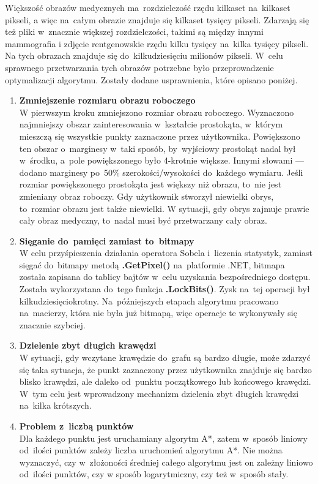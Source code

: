 \documentclass[a4paper,11pt,twoside,openright]{report}
\theoremstyle{definition}
\begin{document}
Większość obrazów medycznych ma~rozdzielczość rzędu kilkaset na~kilkaset pikseli,
a więc na~całym obrazie znajduje się kilkaset tysięcy pikseli. Zdarzają się też
pliki w~znacznie większej rozdzielczości, takimi są między innymi mammografia i
zdjęcie rentgenowskie rzędu kilku tysięcy na~kilka tysięcy pikseli.
Na tych obrazach znajduje się do~kilkudziesięciu milionów
pikseli. W~celu sprawnego przetwarzania tych obrazów potrzebne było przeprowadzenie optymalizacji
algorytmu. Zostały dodane usprawnienia, które opisano poniżej.
\begin{enumerate}
\item \textbf {Zmniejszenie rozmiaru obrazu roboczego} \\
W pierwszym kroku zmniejszono rozmiar obrazu roboczego. Wyznaczono najmniejszy obszar zainteresowania w~kształcie
prostokąta, w~którym mieszczą się wszystkie punkty zaznaczone przez użytkownika.
Powiększono ten obszar o~marginesy w~taki sposób, by~wyjściowy prostokąt nadal
był w~środku, a~pole powiększonego było 4-krotnie większe. Innymi słowami ---
dodano marginesy po~50\% szerokości/wysokości do~każdego wymiaru. Jeśli rozmiar
powiększonego prostokąta jest większy niż obrazu, to~nie jest zmieniany obraz roboczy.
Gdy użytkownik stworzył niewielki obrys, to~rozmiar obrazu jest także niewielki.
W sytuacji, gdy obrys zajmuje prawie cały obraz medyczny, to~nadal musi być
przetwarzany cały obraz.
\item \textbf {Sięganie do~pamięci zamiast to~bitmapy} \\
W celu przyśpieszenia działania operatora Sobela i~liczenia statystyk, zamiast
sięgać do~bitmapy metodą \textbf{.GetPixel()} na~platformie .NET, bitmapa została zapisana
do tablicy bajtów w~celu uzyskania bezpośredniego dostępu. Została wykorzystana do~tego
funkcja \textbf{.LockBits()}. Zysk na~tej operacji był kilkudziesięciokrotny. Na~późniejszych
etapach algorytmu pracowano na~macierzy, która nie była już bitmapą, więc operacje
te wykonywały się znacznie szybciej.
\item \textbf {Dzielenie zbyt długich krawędzi} \\
W sytuacji, gdy wczytane krawędzie do~grafu są bardzo długie, może zdarzyć się
taka sytuacja, że punkt zaznaczony przez użytkownika znajduje się bardzo blisko
krawędzi, ale daleko od~punktu początkowego lub końcowego krawędzi. W~tym celu
jest wprowadzony mechanizm dzielenia zbyt długich krawędzi na~kilka krótszych.
\item \textbf {Problem z~liczbą punktów} \\
Dla każdego punktu jest uruchamiany algorytm A*, zatem w~sposób liniowy od~ilości
punktów zależy liczba uruchomień algorytmu A*. Nie można wyznaczyć, czy w~złożoności
średniej całego algorytmu jest on zależny liniowo od~ilości punktów, czy
w sposób logarytmiczny, czy też w~sposób stały.
\end{enumerate}
\end{document}
